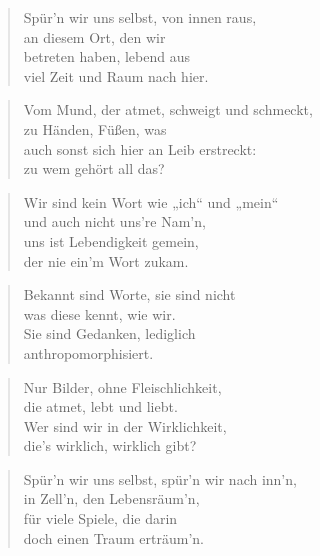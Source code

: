 \documentclass[10pt,a4paper]{article}
\begin{document}
\begin{multicols}{2}
\begin{verse}
Spür’n wir uns selbst, von innen raus, \\
an diesem Ort, den wir \\
betreten haben, lebend aus \\
viel Zeit und Raum nach hier. \\
\end{verse}

\begin{verse}
Vom Mund, der atmet, schweigt und schmeckt, \\
zu Händen, Füßen, was \\
auch sonst sich hier an Leib erstreckt: \\
zu wem gehört all das? \\
\end{verse}

\begin{verse}
Wir sind kein Wort wie „ich“ und „mein“ \\
und auch nicht uns’re Nam’n, \\
uns ist Lebendigkeit gemein, \\
der nie ein’m Wort zukam. \\
\end{verse}

\begin{verse}
Bekannt sind Worte, sie sind nicht \\
was diese kennt, wie wir. \\
Sie sind Gedanken, lediglich \\
anthropomorphisiert. \\
\end{verse}

\begin{verse}
Nur Bilder, ohne Fleischlichkeit, \\
die atmet, lebt und liebt. \\
Wer sind wir in der Wirklichkeit, \\
die’s wirklich, wirklich gibt? \\
\end{verse}

\begin{verse}
Spür’n wir uns selbst, spür’n wir nach inn’n, \\
in Zell’n, den Lebensräum’n, \\
für viele Spiele, die darin \\
doch einen Traum erträum’n. \\
\end{verse}


\end{multicols}
\end{document}
